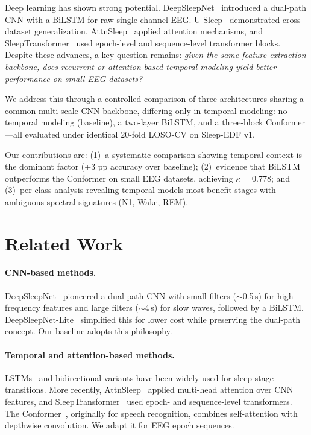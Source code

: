 \documentclass[final]{article}
\begin{document}
Deep learning has shown strong potential. DeepSleepNet~\cite{Supratak2017} introduced a dual-path CNN with a BiLSTM for raw single-channel EEG. U-Sleep~\cite{Perslev2021} demonstrated cross-dataset generalization. AttnSleep~\cite{Eldele2021} applied attention mechanisms, and SleepTransformer~\cite{Phan2022} used epoch-level and sequence-level transformer blocks. Despite these advances, a key question remains: \emph{given the same feature extraction backbone, does recurrent or attention-based temporal modeling yield better performance on small EEG datasets?}

We address this through a controlled comparison of three architectures sharing a common multi-scale CNN backbone, differing only in temporal modeling: no temporal modeling (baseline), a two-layer BiLSTM, and a three-block Conformer---all evaluated under identical 20-fold LOSO-CV on Sleep-EDF v1.

Our contributions are: (1)~a systematic comparison showing temporal context is the dominant factor (+3 pp accuracy over baseline); (2)~evidence that BiLSTM outperforms the Conformer on small EEG datasets, achieving $\kappa = 0.778$; and (3)~per-class analysis revealing temporal models most benefit stages with ambiguous spectral signatures (N1, Wake, REM).

\section{Related Work}

\paragraph{CNN-based methods.}
DeepSleepNet~\cite{Supratak2017} pioneered a dual-path CNN with small filters ($\sim$0.5\,s) for high-frequency features and large filters ($\sim$4\,s) for slow waves, followed by a BiLSTM. DeepSleepNet-Lite~\cite{Fiorillo2019} simplified this for lower cost while preserving the dual-path concept. Our baseline adopts this philosophy.

\paragraph{Temporal and attention-based methods.}
LSTMs~\cite{Hochreiter1997} and bidirectional variants have been widely used for sleep stage transitions. More recently, AttnSleep~\cite{Eldele2021} applied multi-head attention over CNN features, and SleepTransformer~\cite{Phan2022} used epoch- and sequence-level transformers. The Conformer~\cite{Gulati2020}, originally for speech recognition, combines self-attention with depthwise convolution. We adapt it for EEG epoch sequences.
\end{document}
